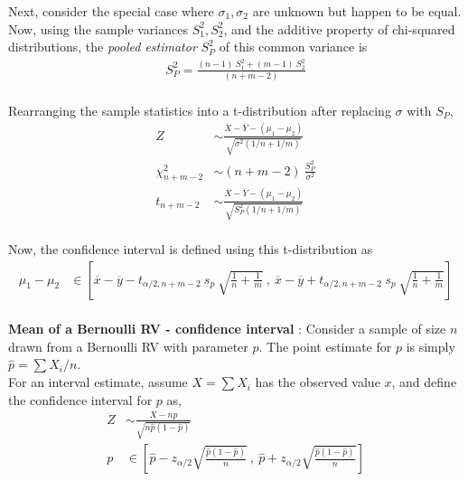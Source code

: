 Next, consider the special case where $ \sigma_1, \sigma_2 $ are unknown but happen to be equal. Now, using the sample variances $ S_1^2, S_2^2 $, and the additive property of chi-squared distributions, the \textit{pooled estimator} $ S_P^2 $ of this common variance is\\

\begin{align}
	S_P^2 = \frac{(n-1)\ S_1^2 + (m-1)\ S_2^2}{(n+m-2)} \nonumber
\end{align}\\

Rearranging the sample statistics into a t-distribution after replacing $ \sigma $ with $ S_P $, \\

\begin{align}
	Z &\sim \frac{\overline{X} - \overline{Y} - (\mu_1 - \mu_2)}{\sqrt{\sigma^2(1/n + 1/m)}} \nonumber \\
	\chi^2_{n+m-2} &\sim (n+m-2)\ \frac{S_P^2}{\sigma^2} \nonumber \\
	t_{n+m-2} &\sim \frac{\overline{X} - \overline{Y} - (\mu_1 - \mu_2)}{\sqrt{S_P^2(1/n + 1/m)}}
\end{align} \\

Now, the confidence interval is defined using this t-distribution as \\


\begin{align}
	\mu_1 - \mu_2 &\in \left[ \overline{x} - \overline{y} - t_{\alpha / 2, n+m-2}\ s_p\ \sqrt{\frac{1}{n} + \frac{1}{m}}\ ,\ \overline{x} - \overline{y} + t_{\alpha / 2, n+m-2}\ s_p\ \sqrt{\frac{1}{n} + \frac{1}{m}} \right] 
\end{align}\\

\textbf{Mean of a Bernoulli RV - confidence interval} : Consider a sample of size $ n $ drawn from a Bernoulli RV with parameter $ p $. The point estimate for $ p $ is simply $ \widehat{p} = \sum X_i / n $. \\

For an interval estimate, assume $ X = \sum X_i $ has the observed value $ x $, and define the confidence interval for $ p $ as, \\

\begin{align}
	Z &\sim \frac{X - np}{\sqrt{n \widehat{p} (1 - \widehat{p})}} \nonumber \\
	p &\in \left[ \widehat{p} - z_{\alpha/2}\sqrt{\frac{\widehat{p}(1-\widehat{p})}{n}}\ ,\ \widehat{p} + z_{\alpha/2}\sqrt{\frac{\widehat{p}(1-\widehat{p})}{n}}  \right]
\end{align}\\

